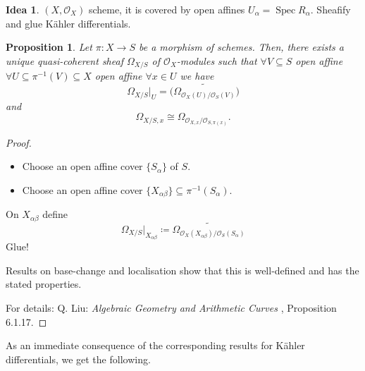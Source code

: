 \documentclass[12pt]{article}
\DeclareMathOperator{\Spec}{Spec}
\newtheorem*{proposition}{Proposition}
\theoremstyle{definition}
\newtheorem*{idea}{Idea}
\begin{document}
\begin{idea}
$(X,\mathcal{O}_X)$ scheme, it is covered by open affines $U_{\alpha}=\Spec R_{\alpha}$. Sheafify and glue K\"{a}hler differentials.
\end{idea}

\begin{proposition}
Let $\pi:X\rightarrow S$ be a morphism of schemes. Then, there exists a unique quasi-coherent sheaf $\Omega_{X/S}$ of $\mathcal{O}_X$-modules such that $\forall V\subseteq S$ open affine $\forall U\subseteq\pi^{-1}(V)\subseteq X$ open affine $\forall x\in U$ we have
\[\Omega_{X/S}|_U=\widetilde{\big(\Omega_{\mathcal{O}_X(U)/\mathcal{O}_S(V)}\big)}\]
and
\[\Omega_{X/S,x}\cong\Omega_{\mathcal{O}_{X,x}/\mathcal{O}_{S,\pi(x)}}.\]
\end{proposition}

\begin{proof}
\begin{itemize}[label=$-$]
\item Choose an open affine cover $\{S_{\alpha}\}$ of $S$.

\item Choose an open affine cover $\{X_{\alpha\beta}\}\subseteq\pi^{-1}(S_{\alpha})$.
\end{itemize}
On $X_{\alpha\beta}$ define
\[\Omega_{X/S}|_{X_{\alpha\beta}}\coloneqq\widetilde{\Omega_{\mathcal{O}_X(X_{\alpha\beta})/\mathcal{O}_S(S_{\alpha})}}\]
Glue!

Results on base-change and localisation show that this is well-defined and has the stated properties.

For details: Q. Liu: \emph{Algebraic Geometry and Arithmetic Curves} \cite{liu2002algebraic}, Proposition 6.1.17.
\end{proof}

As an immediate consequence of the corresponding results for K\"{a}hler differentials, we get the following.
\end{document}
